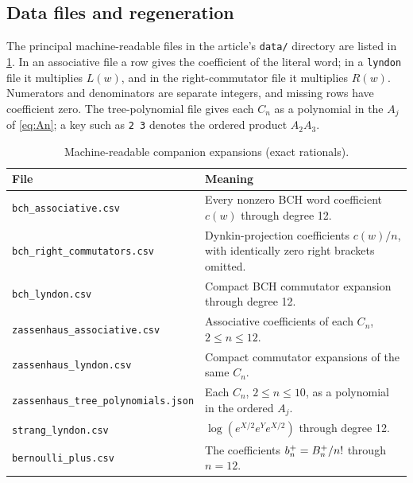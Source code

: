 \subsection{Data files and regeneration}
The principal machine-readable files in the article's \texttt{data/}
directory are listed in \cref{tab:files}. In an associative file a row
gives the coefficient of the literal word; in a \texttt{lyndon} file it
multiplies $L(w)$, and in the right-commutator file it multiplies $R(w)$.
Numerators and denominators are separate integers, and missing rows have
coefficient zero. The tree-polynomial file gives each $C_n$ as a polynomial
in the $A_j$ of \eqref{eq:An}; a key such as \texttt{2 3} denotes the
ordered product $A_2A_3$.
\begin{table}[htbp]
\centering\small
\begin{tabular}{@{}p{}p{}@{}}
\toprule
File & Meaning\\
\midrule
\texttt{bch\_associative.csv} & Every nonzero BCH word coefficient $c(w)$ through degree 12.\\
\texttt{bch\_right\_commutators.csv} & Dynkin-projection coefficients $c(w)/n$, with identically zero right brackets omitted.\\
\texttt{bch\_lyndon.csv} & Compact BCH commutator expansion through degree 12.\\
\texttt{zassenhaus\_associative.csv} & Associative coefficients of each $C_n$, $2\leq n\leq12$.\\
\texttt{zassenhaus\_lyndon.csv} & Compact commutator expansions of the same $C_n$.\\
\texttt{zassenhaus\_tree\_polynomials.json} & Each $C_n$, $2\leq n\leq10$, as a polynomial in the ordered $A_j$.\\
\texttt{strang\_lyndon.csv} & $\log(e^{X/2}e^Ye^{X/2})$ through degree 12.\\
\texttt{bernoulli\_plus.csv} & The coefficients $b^{+}_{n}=B_n^+/n!$ through $n=12$.\\
\bottomrule
\end{tabular}
\caption{Machine-readable companion expansions (exact rationals).}\label{tab:files}
\end{table}

